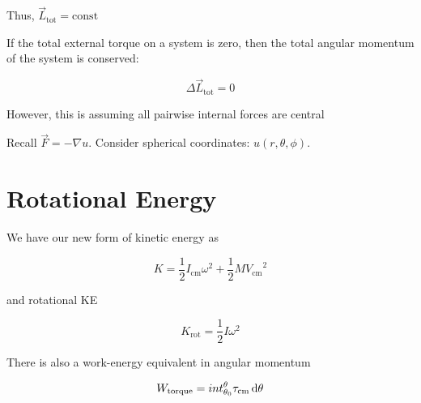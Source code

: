 Thus, $\vec L_\mathrm{tot} = \text{const}$

\begin{theorem}
	If the total external torque on a system is zero, then the total angular momentum of the system is conserved:

	\begin{equation}
		\Delta \vec L_\mathrm{tot} = 0
	\end{equation}

	\begin{remark}
		However, this is assuming all pairwise internal forces are central
	\end{remark}
\end{theorem}

Recall $\vec F = -\nabla u$. Consider spherical coordinates: $u(r,\theta,\phi)$.


\section{Rotational Energy}


\begin{definition}
	We have our new form of kinetic energy as

	\begin{equation}
		K = \frac{1}{2} I_\mathrm{cm} \omega^2 + \frac{1}{2} M {V_\mathrm{cm}}^2
	\end{equation}

	and rotational KE

	\begin{equation}
		K_\mathrm{rot} = \frac{1}{2} I \omega^2
	\end{equation}
\end{definition}

There is also a work-energy equivalent in angular momentum

\begin{equation}
	W_\mathrm{torque} = int_{\theta_0}^\theta \tau_\mathrm{cm} \D \theta
\end{equation}